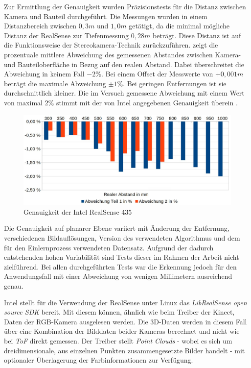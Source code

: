 Zur Ermittlung der Genauigkeit wurden Präzisionstests für die Distanz zwischen Kamera und Bauteil durchgeführt. Die Messungen wurden in einem Distanzbereich zwischen $0,3 m$ und $1,0 m$ getätigt, da die minimal mögliche Distanz der RealSense zur Tiefenmessung $0,28 m$ beträgt. Diese Distanz ist auf die Funktionsweise der Stereokamera-Technik zurückzuführen.  zeigt die prozentuale mittlere Abweichung des gemessenen Abstandes zwischen Kamera- und Bauteiloberfläche in Bezug auf den realen Abstand. Dabei überschreitet die Abweichung in keinem Fall $-2 \%$. Bei einem Offset der Messwerte von $+0,001m$ beträgt die maximale Abweichung $\pm1 \%$. Bei geringen Entfernungen ist sie durchschnittlich kleiner. Die im Versuch gemessene Abweichung mit einem Wert von maximal $2\%$ stimmt mit der von Intel angegebenen Genauigkeit überein \cite{intel_corporation_depth_2022}.

\begin{figure}[ht]
    \centering
    \includegraphics[width=\textwidth]{Bilder/realsense_genauigkeit.jpg}
    \caption{Genauigkeit der Intel RealSense 435}
    \label{fig:realsense_genauigkeit}
\end{figure}

Die Genauigkeit auf planarer Ebene variiert mit Änderung der Entfernung, verschiedenen Bildauflösungen, Version des verwendeten Algorithmus und dem für den Einlernprozess verwendeten Datensatz. Aufgrund der dadurch entstehenden hohen Variabilität sind Tests dieser im Rahmen der Arbeit nicht zielführend. Bei allen durchgeführten Tests war die Erkennung jedoch für den Anwendungsfall mit einer Abweichung von wenigen Millimetern ausreichend genau.

Intel stellt für die Verwendung der RealSense unter Linux das \textit{LibRealSense open source \ac{SDK}} \cite{intel_corporation_intelrealsenselibrealsense_2022} bereit. Mit diesem können, ähnlich wie beim Treiber der Kinect, Daten der RGB-Kamera ausgelesen werden. Die 3D-Daten werden in diesem Fall über eine Kombination der Bilddaten beider Kameras berechnet und nicht wie bei \textit{\ac{ToF}} direkt gemessen. Der Treiber stellt \textit{Point Clouds} - wobei es sich um dreidimensionale, aus einzelnen Punkten zusammengesetzte Bilder handelt - mit optionaler Überlagerung der Farbinformationen zur Verfügung.

